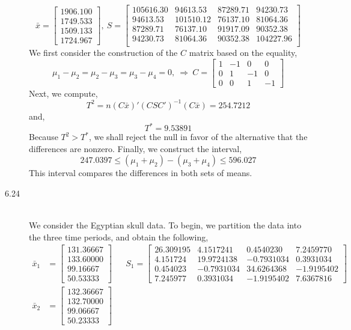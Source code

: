 \documentclass[letterpaper,10pt]{article}
\begin{document}
\begin{description}
\[\bar{x}=\begin{bmatrix}
1906.100\\1749.533\\1509.133\\1724.967
\end{bmatrix},\ S=\begin{bmatrix}
105616.30 & 94613.53 & 87289.71 & 94230.73\\
94613.53 & 101510.12 & 76137.10 & 81064.36\\
87289.71 & 76137.10 & 91917.09 & 90352.38\\
94230.73 & 81064.36 & 90352.38 & 104227.96\\
\end{bmatrix} \]
We first consider the construction of the $C$ matrix based on the equality,
\[\mu_1-\mu_2=\mu_2-\mu_3=\mu_3-\mu_4=0,\ \Rightarrow\ C=\begin{bmatrix}
1 & -1 & 0 & 0\\
0 & 1 & -1 & 0\\
0 & 0 & 1 & -1
\end{bmatrix} \]
Next, we compute,
\[T^2=n(C\bar{x})'(CSC')^{-1}(C\bar{x})=254.7212\]
and,
\[T^*=9.53891\]
Because $T^2>T^*$, we shall reject the null in favor of the alternative that the differences are nonzero. Finally, we construct the interval,
\[247.0397\leq (\mu_1+\mu_2)-(\mu_3+\mu_4)\leq 596.027\]
This interval compares the differences in both sets of means. 
\item[6.24]\hfill \\
We consider the Egyptian skull data. To begin, we partition the data into the three time periods, and obtain the following,
\begin{align*}
\bar{x}_1 &= \begin{bmatrix}
131.36667\\ 133.60000\\ 99.16667\\ 50.53333
\end{bmatrix} && S_1=\begin{bmatrix}
26.309195 & 4.1517241 & 0.4540230 & 7.2459770\\
4.151724 & 19.9724138 & -0.7931034 & 0.3931034\\
0.454023 & -0.7931034 & 34.6264368 & -1.9195402\\
7.245977 & 0.3931034 & -1.9195402 & 7.6367816
\end{bmatrix}\\
\bar{x}_2 &= \begin{bmatrix}
132.36667\\ 132.70000\\ 99.06667\\ 50.23333

\end{bmatrix}
\end{align*}
\end{description}
\end{document}
